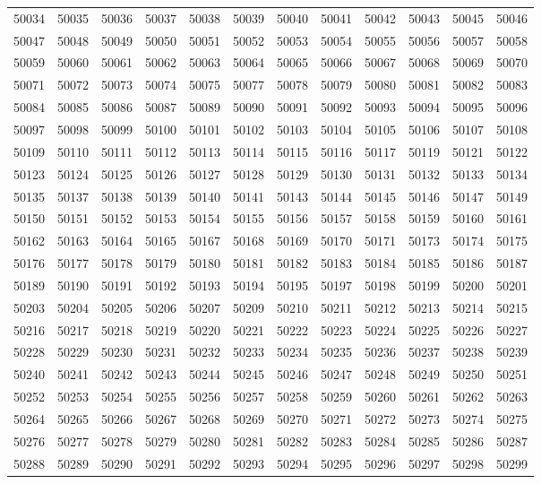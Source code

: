 \begin{center}
\begin{longtable}{llllllllllll}
50034 &50035 &50036 &50037 &50038 &50039 &50040 &50041 &50042 &50043 &50045 &50046 \\
50047 &50048 &50049 &50050 &50051 &50052 &50053 &50054 &50055 &50056 &50057 &50058 \\
50059 &50060 &50061 &50062 &50063 &50064 &50065 &50066 &50067 &50068 &50069 &50070 \\
50071 &50072 &50073 &50074 &50075 &50077 &50078 &50079 &50080 &50081 &50082 &50083 \\
50084 &50085 &50086 &50087 &50089 &50090 &50091 &50092 &50093 &50094 &50095 &50096 \\
50097 &50098 &50099 &50100 &50101 &50102 &50103 &50104 &50105 &50106 &50107 &50108 \\
50109 &50110 &50111 &50112 &50113 &50114 &50115 &50116 &50117 &50119 &50121 &50122 \\
50123 &50124 &50125 &50126 &50127 &50128 &50129 &50130 &50131 &50132 &50133 &50134 \\
50135 &50137 &50138 &50139 &50140 &50141 &50143 &50144 &50145 &50146 &50147 &50149 \\
50150 &50151 &50152 &50153 &50154 &50155 &50156 &50157 &50158 &50159 &50160 &50161 \\
50162 &50163 &50164 &50165 &50167 &50168 &50169 &50170 &50171 &50173 &50174 &50175 \\
50176 &50177 &50178 &50179 &50180 &50181 &50182 &50183 &50184 &50185 &50186 &50187 \\
50189 &50190 &50191 &50192 &50193 &50194 &50195 &50197 &50198 &50199 &50200 &50201 \\
50203 &50204 &50205 &50206 &50207 &50209 &50210 &50211 &50212 &50213 &50214 &50215 \\
50216 &50217 &50218 &50219 &50220 &50221 &50222 &50223 &50224 &50225 &50226 &50227 \\
50228 &50229 &50230 &50231 &50232 &50233 &50234 &50235 &50236 &50237 &50238 &50239 \\
50240 &50241 &50242 &50243 &50244 &50245 &50246 &50247 &50248 &50249 &50250 &50251 \\
50252 &50253 &50254 &50255 &50256 &50257 &50258 &50259 &50260 &50261 &50262 &50263 \\
50264 &50265 &50266 &50267 &50268 &50269 &50270 &50271 &50272 &50273 &50274 &50275 \\
50276 &50277 &50278 &50279 &50280 &50281 &50282 &50283 &50284 &50285 &50286 &50287 \\
50288 &50289 &50290 &50291 &50292 &50293 &50294 &50295 &50296 &50297 &50298 &50299 \\

\end{longtable}
\end{center}
